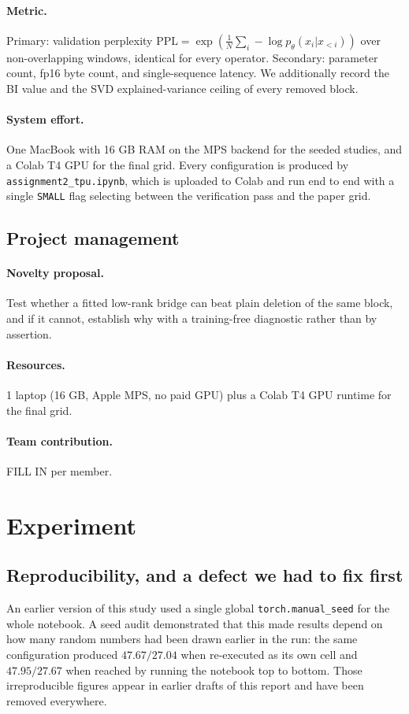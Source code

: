 \documentclass[11pt]{article}
\begin{document}
\paragraph{Metric.} Primary: validation perplexity
$\mathrm{PPL}=\exp(\frac{1}{N}\sum_i -\log p_\theta(x_i|x_{<i}))$ over
non-overlapping windows, identical for every operator. Secondary: parameter
count, fp16 byte count, and single-sequence latency. We additionally record
the BI value and the SVD explained-variance ceiling of every removed block.
\paragraph{System effort.} One MacBook with 16 GB RAM on the MPS backend for
the seeded studies, and a Colab T4 GPU for the final grid. Every configuration
is produced by \texttt{assignment2\_tpu.ipynb}, which is uploaded to Colab
and run end to end with a single \texttt{SMALL} flag selecting between the
verification pass and the paper grid.

\subsection{Project management}
\paragraph{Novelty proposal.} Test whether a fitted low-rank bridge can beat
plain deletion of the same block, and if it cannot, establish why with a
training-free diagnostic rather than by assertion.
\paragraph{Resources.} 1 laptop (16 GB, Apple MPS, no paid GPU) plus a Colab
T4 GPU runtime for the final grid.
\paragraph{Team contribution.} FILL IN per member.

\section{Experiment}

\subsection{Reproducibility, and a defect we had to fix first}
An earlier version of this study used a single global
\texttt{torch.manual\_seed} for the whole notebook. A seed audit demonstrated
that this made results depend on how many random numbers had been drawn
earlier in the run: the same configuration produced $47.67/27.04$ when
re-executed as its own cell and $47.95/27.67$ when reached by running the
notebook top to bottom. Those irreproducible figures appear in earlier drafts
of this report and have been removed everywhere.
\end{document}
